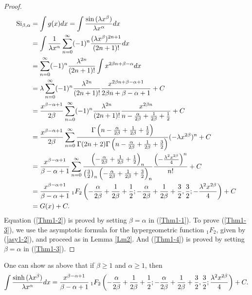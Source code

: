 \documentclass[smallextended]{svjour3}
\begin{document}
\begin{proof}
\begin{align}
\text{Si}_{\beta,\alpha}&=\int g(x) dx=\int \frac{\sin{(\lambda x^\beta)}}{\lambda x^\alpha}dx
\nonumber\\&=\int\frac{1}{\lambda x^\alpha}\sum\limits_{n=0}^{\infty}(-1)^n\frac{(\lambda x^\beta)^{2n+1}}{(2n+1)!}dx
\nonumber\\ &=\sum\limits_{n=0}^{\infty}(-1)^n\frac{\lambda^{2n}}{(2n+1)!}\int{x^{2\beta n+\beta-\alpha}}dx
\nonumber\\&=\lambda\sum\limits_{n=0}^{\infty}(-1)^n\frac{\lambda^{2n}}{(2n+1)!}\frac{x^{2\beta n+\beta-\alpha+1}}{2\beta n+\beta-\alpha+1}+C
\nonumber\\&=\frac{x^{\beta-\alpha+1}}{2\beta}\sum\limits_{n=0}^{\infty}(-1)^n\frac{\lambda^{2n}}{(2n+1)!}\frac{x^{2\beta n}}{n-\frac{\alpha}{2\beta}+\frac{1}{2\beta}+\frac{1}{2}}+C
\nonumber\\&=\frac{x^{\beta-\alpha+1}}{2\beta}\sum\limits_{n=0}^{\infty}\frac{\Gamma\left(n-\frac{\alpha}{2\beta}+\frac{1}{2\beta}+\frac{1}{2}\right)}{\Gamma(2n+2)\Gamma\left(n-\frac{\alpha}{2\beta}+\frac{1}{2\beta}+\frac{3}{2}\right)}(-\lambda x^{2\beta})^{n}+C
\nonumber\\&=\frac{x^{\beta-\alpha+1}}{\beta-\alpha+1}\sum\limits_{n=0}^{\infty}\frac{\left(-\frac{\alpha}{2\beta}+\frac{1}{2\beta}+\frac{1}{2}\right)_n}
{\left(\frac{3}{2}\right)_n\left(-\frac{\alpha}{2\beta}+\frac{1}{2\beta}+\frac{3}{2}\right)_n}\frac{\left(-\frac{\lambda^2 x^{2\beta}}{4}\right)^{n}}{n!}+C
\nonumber\\&=\frac{x^{\beta-\alpha+1}}{\beta-\alpha+1}\hspace{.075cm} _{1}F_{2}\left(-\frac{\alpha}{2\beta}+\frac{1}{2\beta}+\frac{1}{2};-\frac{\alpha}{2\beta}+\frac{1}{2\beta}+\frac{3}{2},\frac{3}{2};-\frac{\lambda^2 x^{2\beta}}{4}\right)+C
\nonumber\\&=G(x)+C.
\end{align}
Equation (\ref{Thm1-2}) is proved by setting $\beta=\alpha$ in (\ref{Thm1-1}).
To prove (\ref{Thm1-3}), we use the asymptotic formula for the hypergeometric function $_{1}F_{2}$, given by (\ref{asy1-2}), and proceed as in Lemma \ref{Lm2}. And (\ref{Thm1-4}) is proved by setting $\beta=\alpha$ in (\ref{Thm1-3}).
\end{proof}

One can show as above that if $\beta\ge1$ and $\alpha\ge1$, then
\begin{align}
\int \frac{\sinh{(\lambda x^\beta)}}{\lambda x^\alpha}dx
=\frac{x^{\beta-\alpha+1}}{\beta-\alpha+1}\hspace{.075cm} _{1}F_{2}\left(-\frac{\alpha}{2\beta}+\frac{1}{2\beta}+\frac{1}{2};-\frac{\alpha}{2\beta}+\frac{1}{2\beta}+\frac{3}{2},\frac{3}{2};\frac{\lambda^2 x^{2\beta}}{4}\right)+C.
\label{sinh1}
\end{align}
\end{document}
